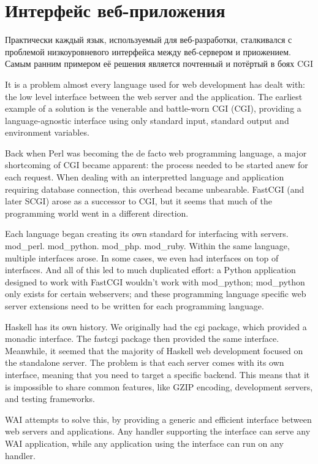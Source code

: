 \chapter {Интерфейс веб-приложения}\label{chap:web_application_interface}

Практически каждый язык, используемый для веб-разработки, сталкивался с проблемой
низкоуровневого интерфейса между веб-сервером и приожением. Самым ранним примером
её решения является почтенный и потёртый в боях CGI

It is a problem almost every language used for web development has dealt with: 
the low level interface between the web server and the application. The earliest 
example of a solution is the venerable and battle-worn CGI (CGI), providing a 
language-agnostic interface using only standard input, standard output and 
environment variables.

Back when Perl was becoming the de facto web programming language, a major 
shortcoming of CGI became apparent: the process needed to be started anew for 
each request. When dealing with an interpretted language and application 
requiring database connection, this overhead became unbearable. FastCGI 
(and later SCGI) arose as a successor to CGI, but it seems that much of 
the programming world went in a different direction.

Each language began creating its own standard for interfacing with servers. mod\_perl.
mod\_python. mod\_php. mod\_ruby. Within the same language, multiple interfaces arose. In
some cases, we even had interfaces on top of interfaces. And all of this led to much
duplicated effort: a Python application designed to work with FastCGI wouldn't work with
mod\_python; mod\_python only exists for certain webservers; and these programming
language specific web server  extensions need to be written for each programming
language.

Haskell has its own history. We originally had the cgi package, which provided a monadic 
interface. The fastcgi package then provided the same interface. Meanwhile, it seemed that 
the majority of Haskell web development focused on the standalone server. The problem is 
that each server comes with its own interface, meaning that you need to target a specific 
backend. This means that it is impossible to share common features, like GZIP encoding, 
development servers, and testing frameworks.

WAI attempts to solve this, by providing a generic and efficient interface between web 
servers and applications. Any handler supporting the interface can serve any WAI 
application, while any application using the interface can run on any handler.

